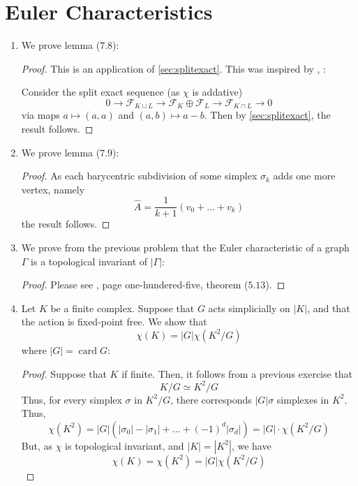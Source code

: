 \documentclass{book}
\DeclareMathOperator*{\card}{\text{card}}
\begin{document}
\section{Euler Characteristics}
\begin{enumerate}[(1)]
    \item We prove lemma ($7.8$): 
        \begin{proof} This is an application of \hyperref[sec:splitexact]{\ref{sec:splitexact}}. This was inspired by \cite{eulerChar}, \cite{maunder}: 
            \par Consider the split exact sequence (as $\chi$ is addative) 
            \[0 \rightarrow \mathcal{F}_{K\cup L} \rightarrow \mathcal{F}_{K} \oplus \mathcal{F}_{L} \rightarrow \mathcal{F}_{K\cap L} \rightarrow 0\]
            via maps $a \mapsto (a,a)$ and $(a,b) \mapsto a -b$. Then by  \hyperref[sec:splitexact]{\ref{sec:splitexact}}, the result follows. 
        \end{proof}

    \item We prove lemma ($7.9$): 
        \begin{proof} As each barycentric subdivision of some simplex $\sigma_k$ adds one more vertex, namely 
            \[\hat{A} =  \frac{1}{k+1} (v_0 + \dots + v_k)\]
            the result follows. 
        \end{proof}

    \item We prove from the previous problem that the Euler characteristic of a graph $\Gamma$ is a topological invariant of $|\Gamma|$: 
        \begin{proof} Please see \cite{kinsey}, page one-hundered-five, theorem ($5.13$). 
        \end{proof}

    \item Let $K$ be a finite complex. Suppose that $G$ acts simplicially on $|K|$, and that the action is fixed-point free. We show that 
        \[\chi(K) = |G| \chi(K^2/G)\]
        where $|G| = \card G$:
        \begin{proof} Suppose that $K$ if finite. Then, it follows from a previous exercise that 
            \[K/G \simeq K^2/G\]
            Thus, for every simplex $\sigma$ in $K^2/G$, there corresponds $|G| \sigma$  simplexes in $K^2$. Thus, 
            \[\chi(K^2) = |G| (|\sigma_0| - |\sigma_1| + \dots + (-1)^d|\sigma_d| ) = |G| \cdot \chi(K^2/G)\]
            But, as $\chi$ is topological invariant, and $|K| = |K^2|$, we have 
            \[\chi(K ) = \chi(K^2) = |G|\chi(K^2/G)\]
        \end{proof}


\end{enumerate}
\end{document}
